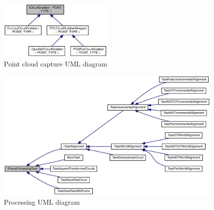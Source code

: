 \documentclass{entcs}
\begin{document}
\begin{figure}[h!]
  \centering
  \includegraphics[width=0.5\textwidth]{graphics/cloudcapture_class_diag.eps}
  \caption{Point cloud capture UML diagram}
  \label{fig:framework_cloudcapture}
\end{figure}

\begin{figure}[h!]
  \centering
  \includegraphics[width=\textwidth]{graphics/processing_class_diag.eps}
  \caption{Processing UML diagram}
  \label{fig:framework_processing}
\end{figure}
\end{document}
